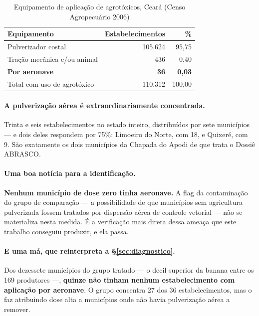 \begin{table}[htbp]
\centering
\caption{Equipamento de aplicação de agrotóxicos, Ceará (Censo Agropecuário 2006)}
\label{tab:equipamento}
\small
\begin{tabular}{lrr}
\toprule
\textbf{Equipamento} & \textbf{Estabelecimentos} & \textbf{\%} \\
\midrule
Pulverizador costal                & 105.624 & 95,75 \\
Tração mecânica e/ou animal        &     436 &  0,40 \\
\textbf{Por aeronave}              & \textbf{36} & \textbf{0,03} \\
\midrule
Total com uso de agrotóxico        & 110.312 & 100,00 \\
\bottomrule
\end{tabular}
\end{table}

\paragraph{A pulverização aérea é extraordinariamente concentrada.}
Trinta e seis estabelecimentos no estado inteiro, distribuídos por sete
municípios --- e dois deles respondem por 75\%: Limoeiro do Norte, com 18, e
Quixeré, com 9. São exatamente os dois municípios da Chapada do Apodi de que
trata o Dossiê ABRASCO.

\paragraph{Uma boa notícia para a identificação.}
\textbf{Nenhum município de dose zero tinha aeronave.} A flag da contaminação do
grupo de comparação --- a possibilidade de que municípios sem agricultura
pulverizada fossem tratados por dispersão aérea de controle vetorial --- não se
materializa nesta medida. É a verificação mais direta dessa ameaça que este
trabalho conseguiu produzir, e ela passa.

\paragraph{E uma má, que reinterpreta a §\ref{sec:diagnostico}.}
Dos dezessete municípios do grupo tratado --- o decil superior da banana entre
os 169 produtores ---, \textbf{quinze não tinham nenhum estabelecimento com
aplicação por aeronave}. O grupo concentra 27 dos 36 estabelecimentos, mas o faz
atribuindo dose alta a municípios onde não havia pulverização aérea a remover.


